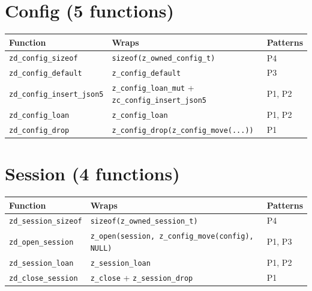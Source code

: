 \documentclass[11pt,a4paper]{article}
\newcommand{\code}[1]{\texttt{#1}}
\newcommand{\fn}[1]{\texttt{#1}}
\begin{document}
\section{Config (5 functions)}

\begin{table}[ht]
\centering\small
\begin{tabularx}{\textwidth}{llL}
  \toprule
  \textbf{Function} & \textbf{Wraps} & \textbf{Patterns} \\
  \midrule
  \fn{zd\_config\_sizeof} & \code{sizeof(z\_owned\_config\_t)} & P4 \\
  \fn{zd\_config\_default} & \fn{z\_config\_default} & P3 \\
  \fn{zd\_config\_insert\_json5} & \fn{z\_config\_loan\_mut} + \fn{zc\_config\_insert\_json5} & P1, P2 \\
  \fn{zd\_config\_loan} & \fn{z\_config\_loan} & P1, P2 \\
  \fn{zd\_config\_drop} & \fn{z\_config\_drop(z\_config\_move(...))} & P1 \\
  \bottomrule
\end{tabularx}
\end{table}


\section{Session (4 functions)}

\begin{table}[ht]
\centering\small
\begin{tabularx}{\textwidth}{llL}
  \toprule
  \textbf{Function} & \textbf{Wraps} & \textbf{Patterns} \\
  \midrule
  \fn{zd\_session\_sizeof} & \code{sizeof(z\_owned\_session\_t)} & P4 \\
  \fn{zd\_open\_session} & \fn{z\_open(session, z\_config\_move(config), NULL)} & P1, P3 \\
  \fn{zd\_session\_loan} & \fn{z\_session\_loan} & P1, P2 \\
  \fn{zd\_close\_session} & \fn{z\_close} + \fn{z\_session\_drop} & P1 \\
  \bottomrule
\end{tabularx}
\end{table}
\end{document}
